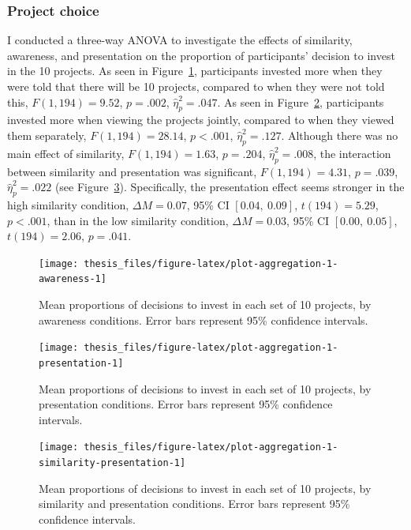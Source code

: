\documentclass[a4paper, nobind, dvipsnames]{templates/ociamthesis}
\theoremstyle{definition}
\theoremstyle{definition}
\theoremstyle{definition}
\theoremstyle{definition}
\theoremstyle{remark}
\begin{document}
\subsubsection{Project choice}

I conducted a three-way ANOVA to investigate the effects of similarity,
awareness, and presentation on the proportion of participants' decision to
invest in the 10 projects. As seen in
Figure~\ref{fig:plot-aggregation-1-awareness}, participants invested more when
they were told that there will be 10 projects, compared to when they were not
told this, \(F(1, 194) = 9.52\), \(p = .002\), \(\hat{\eta}^2_p = .047\). As seen in
Figure~\ref{fig:plot-aggregation-1-presentation}, participants invested more
when viewing the projects jointly, compared to when they viewed them separately,
\(F(1, 194) = 28.14\), \(p < .001\), \(\hat{\eta}^2_p = .127\). Although there was no main effect of
similarity, \(F(1, 194) = 1.63\), \(p = .204\), \(\hat{\eta}^2_p = .008\), the interaction between
similarity and presentation was significant,
\(F(1, 194) = 4.31\), \(p = .039\), \(\hat{\eta}^2_p = .022\) (see
Figure~\ref{fig:plot-aggregation-1-similarity-presentation}). Specifically, the
presentation effect seems stronger in the high similarity condition,
\(\Delta M = 0.07\), 95\% CI \([0.04,~0.09]\), \(t(194) = 5.29\), \(p < .001\), than in the low similarity
condition, \(\Delta M = 0.03\), 95\% CI \([0.00,~0.05]\), \(t(194) = 2.06\), \(p = .041\).



\begin{figure}
\texttt{[image: thesis\_files/figure-latex/plot-aggregation-1-awareness-1]} \caption{Mean proportions of decisions to invest in each set of 10 projects, by awareness conditions. Error bars represent 95\% confidence intervals.}\label{fig:plot-aggregation-1-awareness}
\end{figure}



\begin{figure}
\texttt{[image: thesis\_files/figure-latex/plot-aggregation-1-presentation-1]} \caption{Mean proportions of decisions to invest in each set of 10 projects, by presentation conditions. Error bars represent 95\% confidence intervals.}\label{fig:plot-aggregation-1-presentation}
\end{figure}



\begin{figure}
\texttt{[image: thesis\_files/figure-latex/plot-aggregation-1-similarity-presentation-1]} \caption{Mean proportions of decisions to invest in each set of 10 projects, by similarity and presentation conditions. Error bars represent 95\% confidence intervals.}\label{fig:plot-aggregation-1-similarity-presentation}
\end{figure}
\end{document}
